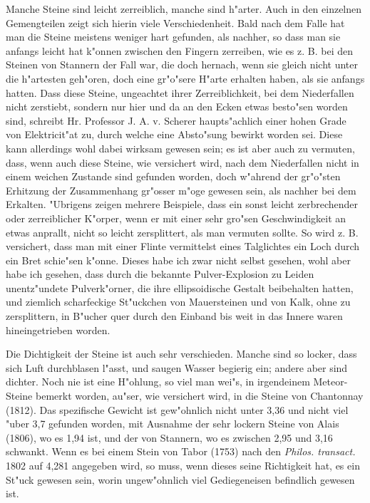\documentclass[a4paper, 11pt, oneside, polutonikogreek, german]{article}
\begin{document}
Manche Steine sind leicht zerreiblich, manche sind h"arter. Auch in den einzelnen Gemengteilen zeigt sich hierin viele Verschiedenheit. Bald nach dem Falle hat man die Steine meistens weniger hart gefunden, als nachher, so dass man sie anfangs leicht hat k"onnen zwischen den Fingern zerreiben, wie es z. B. bei den Steinen von Stannern der Fall war, die doch hernach, wenn sie gleich nicht unter die h"artesten geh"oren, doch eine gr"o"sere H"arte erhalten haben, als sie anfangs hatten. Dass diese Steine, ungeachtet ihrer Zerreiblichkeit, bei dem Niederfallen nicht zerstiebt, sondern nur hier und da an den Ecken etwas besto"sen worden sind, schreibt Hr. Professor J. A. v. Scherer haupts"achlich einer hohen Grade von Elektricit"at zu, durch welche eine Absto"sung bewirkt worden sei. Diese kann allerdings wohl dabei wirksam gewesen sein; es ist aber auch zu vermuten, dass, wenn auch diese Steine, wie versichert wird, nach dem Niederfallen nicht in einem weichen Zustande sind gefunden worden, doch w"ahrend der gr"o"sten Erhitzung der Zusammenhang gr"osser m"oge gewesen sein, als nachher bei dem Erkalten. "Ubrigens zeigen mehrere Beispiele, dass ein sonst leicht zerbrechender oder zerreiblicher K"orper, wenn er mit einer sehr gro"sen Geschwindigkeit an etwas anprallt, nicht so leicht zersplittert, als man vermuten sollte. So wird z. B. versichert, dass man mit einer Flinte vermittelst eines Talglichtes ein Loch durch ein Bret schie"sen k"onne. Dieses habe ich zwar nicht selbst gesehen, wohl aber habe ich gesehen, dass durch die bekannte Pulver-Explosion zu Leiden unentz"undete Pulverk"orner, die ihre ellipsoidische Gestalt beibehalten hatten, und ziemlich scharfeckige St"uckchen von Mauersteinen und von Kalk, ohne zu zersplittern, in B"ucher quer durch den Einband bis weit in das Innere waren hineingetrieben worden.

Die Dichtigkeit der Steine ist auch sehr verschieden. Manche sind so locker, dass sich Luft durchblasen l"asst, und saugen Wasser begierig ein; andere aber sind dichter. Noch nie ist eine H"ohlung, so viel man wei"s, in irgendeinem Meteor-Steine bemerkt worden, au"ser, wie versichert wird, in die Steine von Chantonnay (1812). Das spezifische Gewicht ist gew"ohnlich nicht unter 3,36 und nicht viel "uber 3,7 gefunden worden, mit Ausnahme der sehr lockern Steine von Alais (1806), wo es 1,94 ist, und der von Stannern, wo es zwischen 2,95 und 3,16 schwankt. Wenn es bei einem Stein von Tabor (1753) nach den \emph{Philos. transact.} 1802 auf 4,281 angegeben wird, so muss, wenn dieses seine Richtigkeit hat, es ein St"uck gewesen sein, worin ungew"ohnlich viel Gediegeneisen befindlich gewesen ist.
\end{document}
